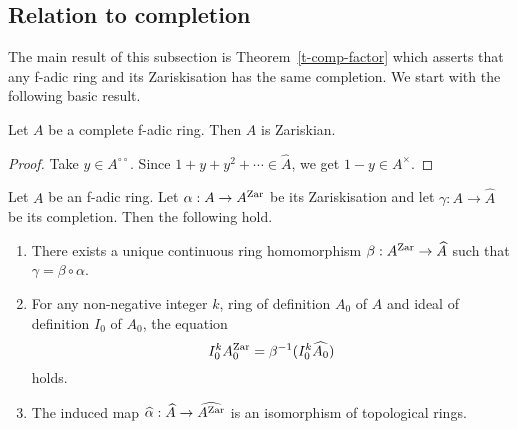 \subsection{Relation to completion}\label{ss-zar-comp}



The main result of this subsection 
is Theorem~\ref{t-comp-factor} 
which asserts that any f-adic ring and its Zariskisation 
has the same completion. 
We start with the following basic result. 


\begin{lem}\label{l-comp-zar}
Let $A$ be a complete f-adic ring. 
Then $A$ is Zariskian. 
\end{lem}

\begin{proof}
Take $y \in A^{\circ\circ}$. 
Since $1+y+y^2+\cdots \in \widehat{A}$, we get $1-y \in A^{\times}$.  
\end{proof}



\begin{thm}\label{t-comp-factor}
Let $A$ be an f-adic ring. 
Let $\alpha:A \to A^{{\operatorname{Zar}}}$ be its Zariskisation and 
let $\gamma:A \to \widehat{A}$ be its completion. 
Then the following hold. 
\begin{enumerate}
\item 
There exists a unique continuous 
ring homomorphism $\beta:A^{{\operatorname{Zar}}} \to \widehat{A}$ such that $\gamma=\beta \circ \alpha$. 
\item 
For any non-negative integer $k$, 
ring of definition $A_0$ of $A$ and ideal of definition $I_0$ of $A_0$, 
the equation 
$$I_0^kA_0^{{\operatorname{Zar}}}=\beta^{-1}(I_0^k \widehat{A_0})$$
holds.   
\item 
The induced map $\widehat{\alpha}:\widehat{A} \to \widehat{A^{{\operatorname{Zar}}}}$ 
is an isomorphism of topological rings. 
\end{enumerate}
\end{thm}

